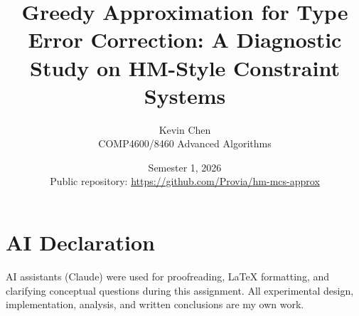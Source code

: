 \documentclass[11pt,a4paper]{article}
\title{Greedy Approximation for Type Error Correction:
A Diagnostic Study on HM-Style Constraint Systems}
\author{Kevin Chen\\COMP4600/8460 Advanced Algorithms}
\date{Semester 1, 2026\\[0.5em]
\small Public repository: \url{https://github.com/Provia/hm-mcs-approx}}
\begin{document}
\maketitle







\pagebreak
\section*{AI Declaration}
AI assistants (Claude) were used for proofreading, LaTeX
formatting, and clarifying conceptual questions during this assignment.
All experimental design, implementation, analysis, and written conclusions
are my own work.

\printbibliography
\end{document}
